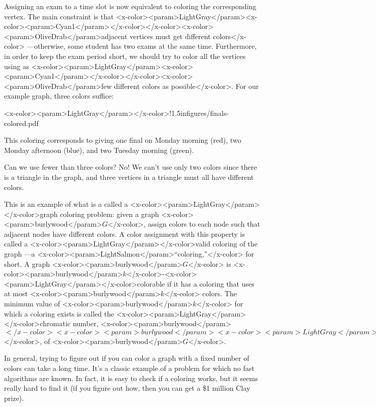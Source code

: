 {Assigning an exam to a time slot is now equivalent to coloring the
corresponding vertex.  The main constraint is that <x-color><param>LightGray</param><x-color><param>Cyan1</param>\emph</x-color></x-color><x-color><param>OliveDrab</param>{adjacent vertices
  must get different colors}</x-color> ---otherwise, some student has two exams at
the same time.  Furthermore, in order to keep the exam period short, we
should try to color all the vertices using as <x-color><param>LightGray</param><x-color><param>Cyan1</param>\emph</x-color></x-color><x-color><param>OliveDrab</param>{few different colors
  as possible}</x-color>.  For our example graph, three colors suffice:

<x-color><param>LightGray</param>\mfigure</x-color>{!}{1.5in}{figures/finals-colored.pdf}

This coloring corresponds to giving one final on Monday morning (red),
two Monday afternoon (blue), and two Tuesday morning (green).

Can we use fewer than three colors?  No! We can't use only two colors
since there is a triangle in the graph, and three vertices in a triangle
must all have different colors.

This is an example of what is a called a <x-color><param>LightGray</param>\term</x-color>{graph coloring problem}:
given a graph <x-color><param>burlywood</param>$G$</x-color>, assign colors to each node such that adjacent nodes
have different colors.  A color assignment with this property is called a
<x-color><param>LightGray</param>\term</x-color>{valid coloring} of the graph ---a <x-color><param>LightSalmon</param>``coloring,''</x-color> for short.  A graph
<x-color><param>burlywood</param>$G$</x-color> is <x-color><param>burlywood</param>$k$</x-color>-<x-color><param>LightGray</param>\term</x-color>{colorable} if it has a coloring that uses at most <x-color><param>burlywood</param>$k$</x-color>
colors.  The minimum value of <x-color><param>burlywood</param>$k$</x-color> for which a coloring exists is called
the <x-color><param>LightGray</param>\term</x-color>{chromatic number}, <x-color><param>burlywood</param>$</x-color><x-color><param>burlywood</param><x-color><param>LightGray</param>\chi</x-color></x-color><x-color><param>burlywood</param>(G)$</x-color>, of <x-color><param>burlywood</param>$G$</x-color>.

In general, trying to figure out if you can color a graph with a fixed
number of colors can take a long time.  It's a classic example of a
problem for which no fast algorithms are known.  In fact, it is easy to
check if a coloring works, but it seems really hard to find it (if you
figure out how, then you can get a \$1 million Clay prize).

}
